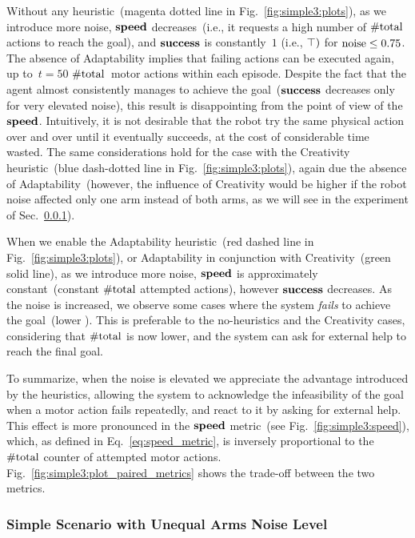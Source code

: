 Without any heuristic~(magenta dotted line in Fig.~\ref{fig:simple3:plots}), as we introduce more noise, $\textbf{\ensuremath{\text{speed}}}$ decreases~(i.e., it requests a high number of $\text{\#total}$ actions to reach the goal), and $\textbf{\ensuremath{\text{success}}}$ is constantly~$1$ (i.e., $\top)$ for $\text{noise} \leq 0.75$. The absence of Adaptability implies that failing actions can be executed again, up to~$t = 50$ $\text{\#total}$~motor actions within each episode. Despite the fact that the agent almost consistently manages to achieve the goal~($\textbf{\ensuremath{\text{success}}}$ decreases only for very elevated noise), this result is disappointing from the point of view of the $\textbf{\ensuremath{\text{speed}}}$. Intuitively, it is not desirable that the robot try the same physical action over and over until it eventually succeeds, at the cost of considerable time wasted.
The same considerations hold for the case with the Creativity heuristic~(blue dash-dotted line in Fig.~\ref{fig:simple3:plots}), again due the absence of Adaptability~(however, the influence of Creativity would be higher if the robot noise affected only one arm instead of both arms, as we will see in the experiment of Sec.~\ref{sec:poeticon++:results:quantitative:simple_onearm}).

When we enable the Adaptability heuristic~(red dashed line in Fig.~\ref{fig:simple3:plots}), or Adaptability in conjunction with Creativity~(green solid line), as we introduce more noise, $\textbf{\ensuremath{\text{speed}}}$ is approximately constant~(constant $\text{\#total}$ attempted actions), however $\textbf{\ensuremath{\text{success}}}$ decreases.
As the noise is increased, we observe some cases where the system \emph{fails} to achieve the goal~(lower \varAvgSuccess).
This is preferable to the no-heuristics and the Creativity cases, considering that $\text{\#total}$ is now lower, and the system can ask for external help to reach the final goal.

To summarize, when the noise is elevated we appreciate the advantage introduced by the heuristics, allowing the system to acknowledge the infeasibility of the goal when a motor action fails repeatedly, and react to it by asking for external help. This effect is more pronounced in the $\textbf{\ensuremath{\text{speed}}}$ metric~(see Fig.~\ref{fig:simple3:speed}), which, as defined in Eq.~\ref{eq:speed_metric}, is inversely proportional to the $\text{\#total}$ counter of attempted motor actions.
Fig.~\ref{fig:simple3:plot_paired_metrics} shows the trade-off between the two metrics.

\subsubsection{Simple Scenario with Unequal Arms Noise Level}
\label{sec:poeticon++:results:quantitative:simple_onearm}

